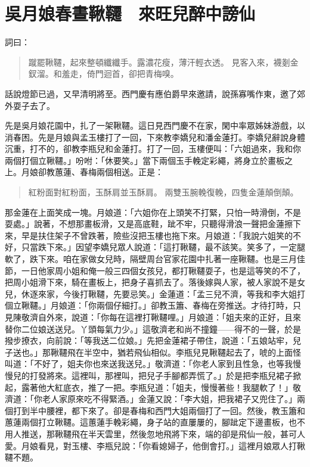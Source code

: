 
\chapter{吳月娘春晝鞦韆　來旺兒醉中謗仙}

詞曰：
\begin{quote}
蹴罷鞦韆，起來整頓纖纖手。露濃花瘦，薄汗輕衣透。
見客入來，襪剗金釵溜。和羞走，倚門迴首，卻把青梅嗅。
\end{quote}

話說燈節已過，又早清明將至。西門慶有應伯爵早來邀請，說孫寡嘴作東，邀了郊外耍子去了。

先是吳月娘花園中，扎了一架鞦韆。這日見西門慶不在家，閑中率眾姊妹游戲，以消春困。先是月娘與孟玉樓打了一回，下來教李嬌兒和潘金蓮打。李嬌兒辭說身體沉重，打不的，卻教李瓶兒和金蓮打。打了一回，玉樓便叫：「六姐過來，我和你兩個打個立鞦韆。」吩咐：「休要笑。」當下兩個玉手輓定彩繩，將身立於畫板之上。月娘卻教蕙蓮、春梅兩個相送。正是：
\begin{quote}
紅粉面對紅粉面，玉酥肩並玉酥肩。
兩雙玉腕輓復輓，四隻金蓮顛倒顛。
\end{quote}

那金蓮在上面笑成一塊。月娘道：「六姐你在上頭笑不打緊，只怕一時滑倒，不是耍處。」說著，不想那畫板滑，又是高底鞋，跐不牢，只聽得滑浪一聲把金蓮擦下來，早是扶住架子不曾跌著，險些沒把玉樓也拖下來。月娘道：「我說六姐笑的不好，只當跌下來。」因望李嬌兒眾人說道：「這打鞦韆，最不該笑。笑多了，一定腿軟了，跌下來。咱在家做女兒時，隔壁周台官家花園中扎著一座鞦韆。也是三月佳節，一日他家周小姐和俺一般三四個女孩兒，都打鞦韆耍子，也是這等笑的不了，把周小姐滑下來，騎在畫板上，把身子喜抓去了。落後嫁與人家，被人家說不是女兒，休逐來家，今後打鞦韆，先要忌笑。」金蓮道：「孟三兒不濟，等我和李大姐打個立鞦韆。」月娘道：「你兩個仔細打。」卻教玉簫、春梅在旁推送。才待打時，只見陳敬濟自外來，說道：「你每在這裡打鞦韆哩。」月娘道：「姐夫來的正好，且來替你二位娘送送兒。丫頭每氣力少。」這敬濟老和尚不撞鐘——得不的一聲，於是撥步撩衣，向前說：「等我送二位娘。」先把金蓮裙子帶住，說道：「五娘站牢，兒子送也。」那鞦韆飛在半空中，猶若飛仙相似。李瓶兒見鞦韆起去了，唬的上面怪叫道：「不好了，姐夫你也來送我送兒。」敬濟道：「你老人家到且性急，也等我慢慢兒的打發將來。這裡叫，那裡叫，把兒子手腳都弄慌了。」於是把李瓶兒裙子掀起，露著他大紅底衣，推了一把。李瓶兒道：「姐夫，慢慢著些！我腿軟了！」敬濟道：「你老人家原來吃不得緊酒。」金蓮又說：「李大姐，把我裙子又兜住了。」兩個打到半中腰裡，都下來了。卻是春梅和西門大姐兩個打了一回。然後，教玉簫和蕙蓮兩個打立鞦韆。這蕙蓮手輓彩繩，身子站的直屢屢的，腳跐定下邊畫板，也不用人推送，那鞦韆飛在半天雲里，然後忽地飛將下來，端的卻是飛仙一般，甚可人愛。月娘看見，對玉樓、李瓶兒說：「你看媳婦子，他倒會打。」這裡月娘眾人打鞦韆不題。

